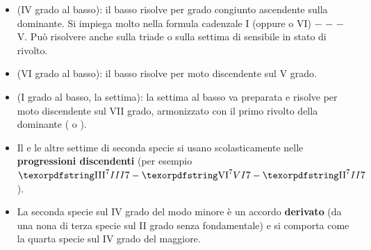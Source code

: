 \begin{itemize}
	\item \textbf{} (IV grado al basso): il basso risolve per grado congiunto ascendente sulla dominante. Si impiega molto nella formula cadenzale I (oppure  o VI) $-$  $-$  $-$ V. Può risolvere anche sulla triade o sulla settima di sensibile in stato di rivolto.
	\item \textbf{} (VI grado al basso): il basso risolve per moto discendente sul V grado.
	\item \textbf{} (I grado al basso, la settima): la settima al basso va preparata e risolve per moto discendente sul VII grado, armonizzato con il primo rivolto della dominante ( o ).
\end{itemize}

\begin{osservazione}
	\label{oss:ii7_progressioni}
	\begin{itemize}
		\item Il  e le altre settime di seconda specie si usano scolasticamente nelle \textbf{progressioni discendenti} (per esempio $\sigla{III}{7}{} - \sigla{VI}{7}{} - \sigla{II}{7}{}$).
		\item La seconda specie sul IV grado del modo minore è un accordo \textbf{derivato} (da una nona di terza specie sul II grado senza fondamentale) e si comporta come la quarta specie sul IV grado del maggiore.
	\end{itemize}
\end{osservazione}
